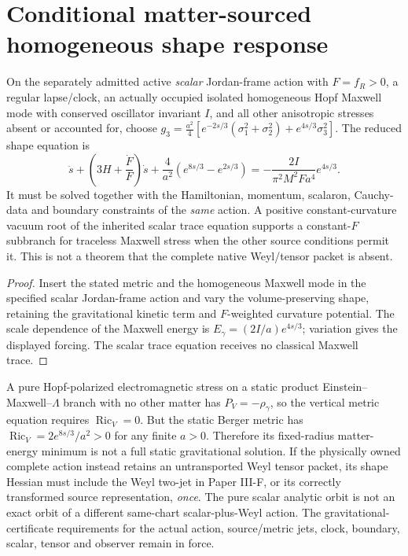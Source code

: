 \documentclass[12pt,a4paper]{article}
\begin{document}
\section{Conditional matter-sourced homogeneous shape response}
\label{bh:berger:v117:p6a:shape-response}
\begin{proposition}
\label{bh:berger:v117:p6a:scalar-branch}
On the separately admitted active \emph{scalar} Jordan-frame action
with $F=f_R>0$, a regular lapse/clock, an actually occupied isolated
homogeneous Hopf Maxwell mode with conserved oscillator invariant
$I$, and all other anisotropic stresses absent or accounted for,
choose $g_3=\frac{a^2}{4}[e^{-2s/3}(\sigma_1^2+\sigma_2^2)
+e^{4s/3}\sigma_3^2]$. The reduced shape equation is
\[
 \ddot s+\left(3H+\frac{\dot F}{F}\right)\dot s
  +\frac4{a^2}\left(e^{8s/3}-e^{2s/3}\right)
 =-\frac{2I}{\pi^2M^2Fa^4}e^{4s/3}.
\]
It must be solved together with the Hamiltonian, momentum, scalaron,
Cauchy-data and boundary constraints of the \emph{same} action.
A positive constant-curvature vacuum root of the inherited scalar
trace equation supports a constant-$F$ subbranch for traceless
Maxwell stress when the other source conditions permit it. This is
not a theorem that the complete native Weyl/tensor packet is absent.
\end{proposition}
\begin{proof}
Insert the stated metric and the homogeneous Maxwell mode in the
specified scalar Jordan-frame action and vary the volume-preserving
shape, retaining the gravitational kinetic term and $F$-weighted
curvature potential. The scale dependence of the Maxwell energy is
$E_\gamma=(2I/a)e^{4s/3}$; variation gives the displayed forcing.
The scalar trace equation receives no classical Maxwell trace.
\end{proof}
\begin{proposition}
\label{bh:berger:v117:p6a:static-gate}
A pure Hopf-polarized electromagnetic stress on a static product
Einstein--Maxwell--$\Lambda$ branch with no other matter has
$P_V=-\rho_\gamma$, so the vertical metric equation requires
$\operatorname{Ric}_V=0$. But the static Berger metric has
$\operatorname{Ric}_V=2e^{8s/3}/a^2>0$ for any finite $a>0$.
Therefore its fixed-radius matter-energy minimum is not a full
static gravitational solution.
If the physically owned complete action instead retains an
untransported Weyl tensor packet, its shape Hessian must include the
Weyl two-jet in Paper III-F, or its correctly transformed source
representation, \emph{once}. The pure scalar analytic orbit is not
an exact orbit of a different same-chart scalar-plus-Weyl action.
The gravitational-certificate requirements for the actual action,
source/metric jets, clock, boundary, scalar, tensor and observer
remain in force.
\end{proposition}
\end{document}
